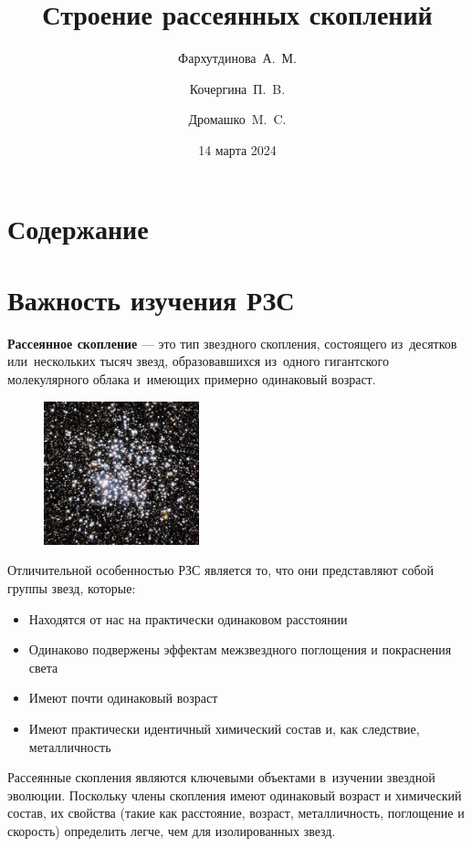 \documentclass{beamer}
\begin{document}
\title{Строение рассеянных скоплений}
\author{Фархутдинова~А.~М. \and Кочергина~П.~B. \and Дромашко~M.~C.}
\date{14 марта 2024}
\maketitle
\section*{Содержание}
\begin{frame}
    \tableofcontents
\end{frame}
\section{Важность изучения РЗС}
\begin{frame}
    \textbf{Рассеянное скопление} --- это тип звездного скопления, состоящего из~десятков или~нескольких тысяч звезд, 
    образовавшихся из~одного гигантского молекулярного облака и~имеющих примерно одинаковый возраст.
    \begin{figure}
        \centering
        \includegraphics[width=0.4\textwidth]{pictures/РЗС.jpg}
    \end{figure}
\end{frame}
\begin{frame}
    Отличительной особенностью РЗС является то, что они представляют собой группы звезд, которые:
    \begin{itemize}
        \item Находятся от нас на практически одинаковом расстоянии
        \item Одинаково подвержены эффектам межзвездного поглощения и покраснения света
        \item Имеют почти одинаковый возраст
        \item Имеют практически идентичный химический состав и, как следствие, металличность
    \end{itemize}
    Рассеянные скопления являются ключевыми объектами в~изучении звездной эволюции. Поскольку члены скопления имеют одинаковый возраст и химический состав, 
    их свойства (такие как расстояние, возраст, металличность, поглощение и скорость) определить легче, 
    чем для изолированных звезд.
\end{frame}
\end{document}
